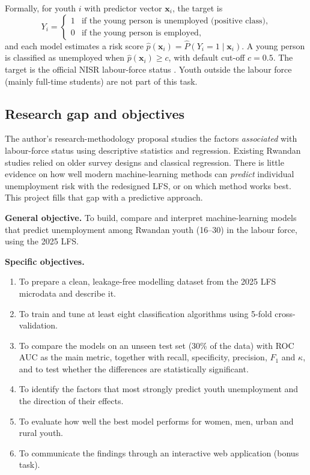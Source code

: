 \documentclass[11pt,a4paper]{article}
\begin{document}
\noindent Formally, for youth $i$ with predictor vector $\mathbf{x}_i$, the target is
\begin{equation}
Y_i=\begin{cases}1 & \text{if the young person is unemployed (positive class)},\\
0 & \text{if the young person is employed,}\end{cases}
\end{equation}
and each model estimates a risk score $\hat p(\mathbf{x}_i)=\widehat{P}(Y_i=1\mid\mathbf{x}_i)$. A
young person is classified as unemployed when $\hat p(\mathbf{x}_i)\ge c$, with default cut-off
$c=0.5$. The target is the official NISR labour-force status \cite{ilo}. Youth outside the labour
force (mainly full-time students) are not part of this task.

\subsection{Research gap and objectives}
The author's research-methodology proposal studies the factors \emph{associated} with labour-force
status using descriptive statistics and regression. Existing Rwandan studies \cite{ndagijimana,afdb} relied on
older survey designs and classical regression. There is little evidence on how well modern
machine-learning methods can \emph{predict} individual unemployment risk with the redesigned LFS, or
on which method works best. This project fills that gap with a predictive approach.

\medskip\noindent\textbf{General objective.} To build, compare and interpret machine-learning models
that predict unemployment among Rwandan youth (16--30) in the labour force, using the 2025 LFS.

\medskip\noindent\textbf{Specific objectives.}
\begin{enumerate}
\item To prepare a clean, leakage-free modelling dataset from the 2025 LFS microdata and describe it.
\item To train and tune at least eight classification algorithms using 5-fold cross-validation.
\item To compare the models on an unseen test set (30\% of the data) with ROC AUC as the main metric,
      together with recall, specificity, precision, $F_1$ and $\kappa$, and to test whether the
      differences are statistically significant.
\item To identify the factors that most strongly predict youth unemployment and the direction of
      their effects.
\item To evaluate how well the best model performs for women, men, urban and rural youth.
\item To communicate the findings through an interactive web application (bonus task).
\end{enumerate}
\end{document}
